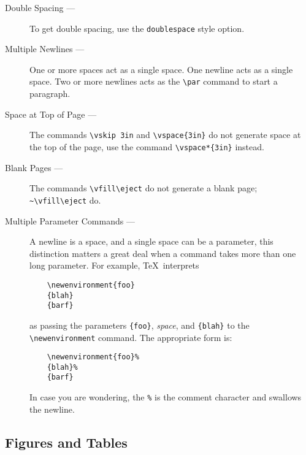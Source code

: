 \begin{description}

\item[Double Spacing ---]
To get double spacing, use the \verb|doublespace| style option.

\item[Multiple Newlines ---]
One or more spaces act as a single space.
One newline acts as a single space.
Two or more newlines acts as the \verb|\par| command to start a paragraph.

\item[Space at Top of Page ---]
The commands \verb|\vskip 3in| and \verb|\vspace{3in}|
do not generate space at the top of the page,
use the command \verb|\vspace*{3in}| instead.

\item[Blank Pages ---]
\sloppy
The commands \verb|\vfill\eject| do not generate a blank page;
\verb|~\vfill\eject| do.

\item[Multiple Parameter Commands ---]
A newline is a space, and a single space can be a parameter,
this distinction matters a great deal
when a command takes more than one long parameter.
For example, \TeX\ interprets
\begin{verbatim}
    \newenvironment{foo}
    {blah}
    {barf}
\end{verbatim}
as passing the parameters \verb|{foo}|, {\em space}, and \verb|{blah}|
to the \verb|\newenvironment| command.
The appropriate form is:
\begin{verbatim}
    \newenvironment{foo}%
    {blah}%
    {barf}
\end{verbatim}
In case you are wondering, the \verb|%| is the comment character
and swallows the newline.

\end{description}

\subsection{Figures and Tables}

